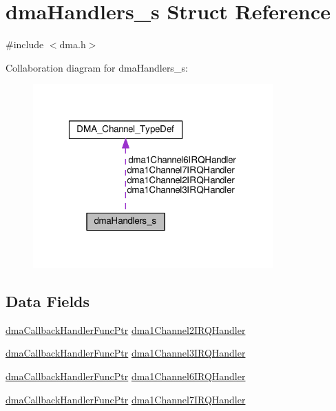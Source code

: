\hypertarget{structdmaHandlers__s}{\section{dma\+Handlers\+\_\+s Struct Reference}
\label{structdmaHandlers__s}
}


{\ttfamily \#include $<$dma.\+h$>$}



Collaboration diagram for dma\+Handlers\+\_\+s\+:\nopagebreak
\begin{figure}[H]
\begin{center}
\leavevmode
\includegraphics[width=262pt]{structdmaHandlers__s__coll__graph}
\end{center}
\end{figure}
\subsection*{Data Fields}
\begin{DoxyCompactItemize}
\item 
\hyperlink{dma_8h_a237ab26e0ec82591214efebd8e6b8875}{dma\+Callback\+Handler\+Func\+Ptr} \hyperlink{structdmaHandlers__s_a14d44b9b87201934105293c676361546}{dma1\+Channel2\+I\+R\+Q\+Handler}
\item 
\hyperlink{dma_8h_a237ab26e0ec82591214efebd8e6b8875}{dma\+Callback\+Handler\+Func\+Ptr} \hyperlink{structdmaHandlers__s_aad52d84e7fd50056b1433a9ed54e68a7}{dma1\+Channel3\+I\+R\+Q\+Handler}
\item 
\hyperlink{dma_8h_a237ab26e0ec82591214efebd8e6b8875}{dma\+Callback\+Handler\+Func\+Ptr} \hyperlink{structdmaHandlers__s_a28cfe1ee0d2f5975d0a8ff1966c72ec0}{dma1\+Channel6\+I\+R\+Q\+Handler}
\item 
\hyperlink{dma_8h_a237ab26e0ec82591214efebd8e6b8875}{dma\+Callback\+Handler\+Func\+Ptr} \hyperlink{structdmaHandlers__s_ae0bfe79b62ffa1efb9ab6f61e4762d9d}{dma1\+Channel7\+I\+R\+Q\+Handler}
\end{DoxyCompactItemize}


